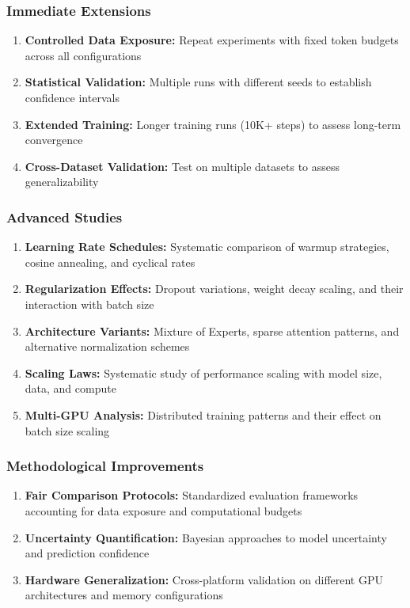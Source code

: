\documentclass[11pt,a4paper]{article}
\begin{document}
\subsubsection{Immediate Extensions}
\begin{enumerate}
    \item \textbf{Controlled Data Exposure:} Repeat experiments with fixed token budgets across all configurations
    \item \textbf{Statistical Validation:} Multiple runs with different seeds to establish confidence intervals
    \item \textbf{Extended Training:} Longer training runs (10K+ steps) to assess long-term convergence
    \item \textbf{Cross-Dataset Validation:} Test on multiple datasets to assess generalizability
\end{enumerate}

\subsubsection{Advanced Studies}
\begin{enumerate}
    \item \textbf{Learning Rate Schedules:} Systematic comparison of warmup strategies, cosine annealing, and cyclical rates
    \item \textbf{Regularization Effects:} Dropout variations, weight decay scaling, and their interaction with batch size
    \item \textbf{Architecture Variants:} Mixture of Experts, sparse attention patterns, and alternative normalization schemes
    \item \textbf{Scaling Laws:} Systematic study of performance scaling with model size, data, and compute
    \item \textbf{Multi-GPU Analysis:} Distributed training patterns and their effect on batch size scaling
\end{enumerate}

\subsubsection{Methodological Improvements}
\begin{enumerate}
    \item \textbf{Fair Comparison Protocols:} Standardized evaluation frameworks accounting for data exposure and computational budgets
    \item \textbf{Uncertainty Quantification:} Bayesian approaches to model uncertainty and prediction confidence
    \item \textbf{Hardware Generalization:} Cross-platform validation on different GPU architectures and memory configurations
\end{enumerate}
\end{document}

